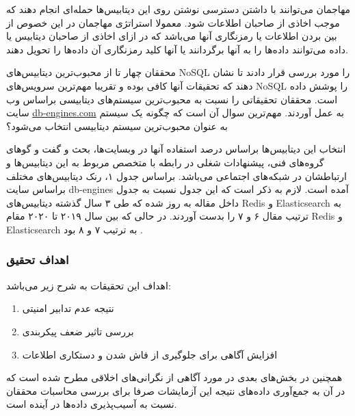 \documentclass[10pt, a4paper]{article}
\begin{document}
مهاجمان می‌توانند با داشتن دسترسی نوشتن روی این دیتابیس‌ها حمله‌ای انجام دهند که
موجب اخاذی از صاحبان اطلاعات شود. معمولا استراتژی مهاجمان در این خصوص از بین
بردن اطلاعات یا رمزنگاری‌ آنها می‌باشد که در ازای اخاذی از صاحبان دیتابیس یا
داده می‌توانند داده‌ها را به آنها برگردانند یا آنها کلید رمزنگاری آن داده‌ها را
تحویل دهند.

محققان چهار تا از محبوب‌‌ترین دیتابیس‌های NoSQL را مورد بررسی قرار دادند تا نشان
دهند که تحقیقات آنها کافی بوده و تقریبا مهم‌ترین سرویس‌های NoSQL را پوشش داده
است. محققان تحقیقاتی را نسبت به محبوب‌ترین سیستم‌های دیتابیسی براساس وب سایت
\href{https://db-engines.com/en/ranking}{db-engines.com} به عمل آوردند. مهم‌ترین
سوال آن است که چگونه یک سیستم به عنوان محبوب‌ترین سیستم دیتابیسی انتخاب می‌شود؟

انتخاب این دیتابیس‌ها براساس درصد استفاده آنها در وبسایت‌ها، بحث و گفت و گو‌های
گروه‌های فنی، پیشنهادات شغلی در رابطه با متخصص مربوط به این دیتابیس‌ها و
ارتباطشان در شبکه‌های اجتماعی می‌باشد. براساس جدول ۱، رنک دیتابیس‌های مختلف
براساس سایت db-engines آمده است. لازم به ذکر است که این جدول نسبت به جدول داخل
مقاله به روز شده که طی ۳ سال گذشته دیتابیس‌های Redis و Elasticsearch به ترتیب
مقال ۶ و ۷ را بدست آوردند. در حالی که بین سال ۲۰۱۹ تا ۲۰۲۰ مقام Redis و
Elasticsearch به ترتیب ۷ و ۸ بود \cite{dbengines}.

\subsubsection{اهداف تحقیق}

اهداف این تحقیقات به شرح زیر می‌باشد:

 \begin{enumerate}
    \item نتیجه عدم تدابیر امنیتی
    \item بررسی تاثیر ضعف پیکربندی
    \item افزایش آگاهی برای جلوگیری از فاش شدن و دستکاری اطلاعات
 \end{enumerate}

همچنین در بخش‌های بعدی در مورد آگاهی از نگرانی‌های اخلاقی مطرح شده است که در آن
به جمع‌آوری داده‌‌های نتیجه این آزمایشات صرفا برای بررسی محاسبات محققان نسبت به
آسیب‌پذیری داده‌ها در آینده است.
\end{document}
